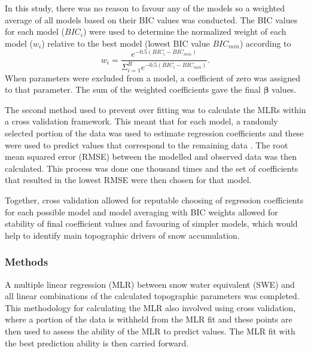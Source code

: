 \documentclass[12pt]{article}
\begin{document}
In this study, there was no reason to favour any of the models so a weighted average of all models based on their BIC values was conducted. The BIC values for each model ($BIC_i$) were used to determine the normalized weight of each model ($w_i$) relative to the best model (lowest BIC value $BIC_{min}$) according to \citep{Burnham2004}
\begin{equation}
w_i = \frac{e^{-0.5(BIC_i-BIC_{min})}}{\Sigma_{i=1}^R e^{-0.5(BIC_i-BIC_{min})}}.
\label{eq:BIC}
\end{equation}
When parameters were excluded from a model, a coefficient of zero was assigned to that parameter. The sum of the weighted coefficients gave the final $\bm{\beta}$ values.

The second method used to prevent over fitting was to calculate the MLRs within a cross validation framework. This meant that for each model, a randomly selected portion of the data was used to estimate regression coefficients and these were used to predict values that correspond to the remaining data \citep{Kohavi1995}. The root mean squared error (RMSE) between the modelled and observed data was then calculated. This process was done one thousand times and the set of coefficients that resulted in the lowest RMSE were then chosen for that model. 

Together, cross validation allowed for reputable choosing of regression coefficients for each possible model and model averaging with BIC weights allowed for stability of final coefficient values and favouring of simpler models, which would help to identify main topographic drivers of snow accumulation. 

\subsubsection{Methods}
\label{sec:MLRMethods}

A multiple linear regression (MLR) between snow water equivalent (SWE) and all linear combinations of the calculated topographic parameters was completed. This methodology for calculating the MLR also involved using cross validation, where a portion of the data is withheld from the MLR fit and these points are then used to assess the ability of the MLR to predict values. The MLR fit with the best prediction ability is then carried forward. 
\end{document}
